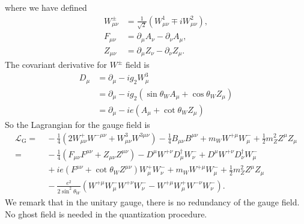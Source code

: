 where we have defined 
\begin{equation}
\begin{aligned}
	W^\pm_{\mu\nu} &= \frac{1}{\sqrt 2} (W^1_{\mu\nu} \mp i W^2_{\mu\nu}), \\
	F_{\mu\nu} &= \partial_\mu A_\nu - \partial_\nu A_\mu, \\
	Z_{\mu\nu} &= \partial_\mu Z_\nu - \partial_\nu Z_\mu.
\end{aligned}
\end{equation}
The covariant derivative for $W^\pm$ field is
\begin{equation}
\begin{aligned}
	D_\mu &= \partial_\mu -i g_2 W^3_\mu \\
	&= \partial_\mu -i g_2 \left(\sin{\theta_W}A_\mu + \cos{\theta_W} Z_\mu \right) \\
	&= \partial_\mu -i e \left(A_\mu + \cot{\theta_W} Z_\mu \right)
\end{aligned}
\end{equation}
So the Lagrangian for the gauge field is
\begin{equation}
\begin{aligned}
	\mathcal L_\mathrm{G}
	=&\ -\frac{1}{4}(2W_{\mu\nu}^+ W^{-\mu\nu} + W_{\mu\nu}^3 W^{3\mu\nu}) -\frac{1}{4} B_{\mu\nu}B^{\mu\nu} + m_W W^{+\mu} W_\mu^- + \frac{1}{2}m_Z^2 Z^\mu Z_\mu \\
	=&\ -\frac{1}{4}(F_{\mu\nu}F^{\mu\nu} + Z_{\mu\nu} Z^{\mu\nu}) - D^{\mu} W^{+\nu} D^\dagger_\mu W_\nu^- + D^\mu W^{+\nu} D^\dagger_\nu W^-_\mu \\
	&\ +ie (F^{\mu\nu} + \cot{\theta_W} Z^{\mu\nu})W_\mu^+ W_\nu^- + m_W W^{+\mu} W_\mu^- + \frac{1}{2}m_Z^2 Z^\mu Z_\mu \\
	&\ -\frac{e^2}{2\sin^2{\theta_W}} \left(W^{+\mu}W^-_\mu W^{+\nu}W^-_\nu - W^{+\mu}W^+_\mu W^{-\nu}W^-_\nu \right).
\end{aligned}
\end{equation}
We remark that in the unitary gauge, there is no redundancy of the gauge field.
No ghost field is needed in the quantization procedure.


